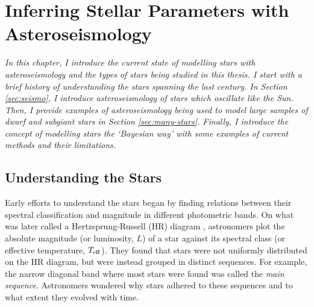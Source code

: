%
%
%
%
%
\chapter[Inferring Stellar Parameters with Asteroseismology]{Inferring Stellar Parameters with Asteroseismology}

\textit{In this chapter, I introduce the current state of modelling stars with asteroseismology and the types of stars being studied in this thesis. I start with a brief history of understanding the stars spanning the last century. In Section \ref{sec:seismo}, I introduce asteroseismology of stars which oscillate like the Sun. Then, I provide examples of asteroseismology being used to model large samples of dwarf and subgiant stars in Section \ref{sec:many-stars}. Finally, I introduce the concept of modelling stars the `Bayesian way' with some examples of current methods and their limitations.}



\section{Understanding the Stars}\label{sec:stars}

Early efforts to understand the stars began by finding relations between their spectral classification and magnitude in different photometric bands. On what was later called a Hertzsprung-Russell (HR) diagram \citep[e.g.][]{Russell1914}, astronomers plot the absolute magnitude (or luminosity, \(L\)) of a star against its spectral class (or effective temperature, \({T_\mathrm{eff}}\)). They found that stars were not uniformly distributed on the HR diagram, but were instead grouped in distinct sequences. For example, the narrow diagonal band where most stars were found was called the \emph{main sequence}. Astronomers wondered why stars adhered to these sequences and to what extent they evolved with time.

